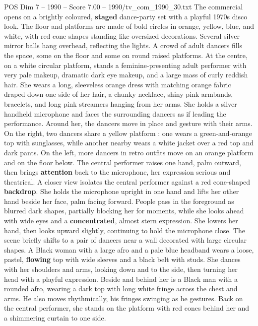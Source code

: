\begin{textsample}{POS Dim 7 – 1990 – Score 7.00 – 1990/tv\_com\_1990\_30.txt}  \label{ex:f7_pos_064}
The commercial opens on a brightly coloured, \textbf{staged} dance-party set with a playful 1970s disco look.
The floor and platforms are made of bold circles in orange, yellow, blue, and white, with red cone shapes standing like oversized decorations.
Several silver mirror balls hang overhead, reflecting the lights.
A crowd of adult dancers fills the space, some on the floor and some on round raised platforms.
At the centre, on a white circular platform, stands a feminine-presenting adult performer with very pale makeup, dramatic dark eye makeup, and a large mass of curly reddish hair.
She wears a long, sleeveless orange dress with matching orange fabric draped down one side of her hair, a chunky necklace, shiny pink armbands, bracelets, and long pink streamers hanging from her arms.
She holds a silver handheld microphone and faces the surrounding dancers as if leading the performance.
Around her, the dancers move in place and gesture with their arms.
On the right, two dancers share a yellow platform : one wears a green-and-orange top with sunglasses, while another nearby wears a white jacket over a red top and dark pants.
On the left, more dancers in retro outfits move on an orange platform and on the floor below.
The central performer raises one hand, palm outward, then brings \textbf{attention} back to the microphone, her expression serious and theatrical.
A closer view isolates the central performer against a red cone-shaped \textbf{backdrop}.
She holds the microphone upright in one hand and lifts her other hand beside her face, palm facing forward.
People pass in the foreground as blurred dark shapes, partially blocking her for moments, while she looks ahead with wide eyes and a \textbf{concentrated}, almost stern expression.
She lowers her hand, then looks upward slightly, continuing to hold the microphone close.
The scene briefly shifts to a pair of dancers near a wall decorated with large circular shapes.
A Black woman with a large afro and a pale blue headband wears a loose, pastel, \textbf{flowing} top with wide sleeves and a black belt with studs.
She dances with her shoulders and arms, looking down and to the side, then turning her head with a playful expression.
Beside and behind her is a Black man with a rounded afro, wearing a dark top with long white fringe across the chest and arms.
He also moves rhythmically, his fringes swinging as he gestures.
Back on the central performer, she stands on the platform with red cones behind her and a shimmering curtain to one side.

\end{textsample}

